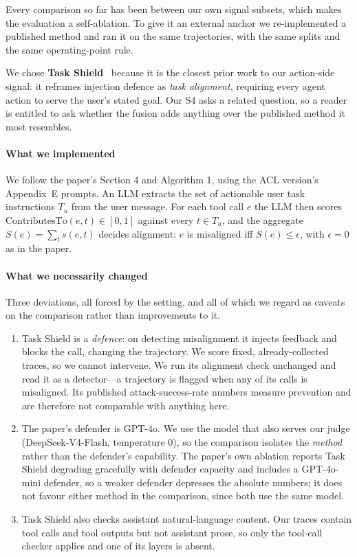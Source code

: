 \documentclass[preprint,12pt,authoryear]{elsarticle}
\theoremstyle{definition}
\begin{document}
Every comparison so far has been between our own signal subsets, which makes the
evaluation a self-ablation. To give it an external anchor we re-implemented a
published method and ran it on the same trajectories, with the same splits and the
same operating-point rule.

We chose \textbf{Task Shield}~\citep{jia2024taskshield} because it is the closest
prior work to our action-side signal: it reframes injection defence as
\emph{task alignment}, requiring every agent action to serve the user's stated
goal. Our S4 asks a related question, so a reader is entitled to ask whether the
fusion adds anything over the published method it most resembles.

\paragraph{What we implemented} We follow the paper's Section 4 and Algorithm 1,
using the ACL version's Appendix~E prompts. An LLM extracts the set of actionable user task
instructions $T_u$ from the user message. For each tool call $e$ the LLM then
scores $\mathrm{ContributesTo}(e,t) \in [0,1]$ against every $t \in T_u$, and the
aggregate $S(e) = \sum_{t} s(e,t)$ decides alignment: $e$ is misaligned iff
$S(e) \le \epsilon$, with $\epsilon = 0$ as in the paper.

\paragraph{What we necessarily changed} Three deviations, all forced by the
setting, and all of which we regard as caveats on the comparison rather than
improvements to it.
\begin{enumerate}
\item Task Shield is a \emph{defence}: on detecting misalignment it injects
feedback and blocks the call, changing the trajectory. We score fixed,
already-collected traces, so we cannot intervene. We run its alignment check
unchanged and read it as a detector---a trajectory is flagged when any of its
calls is misaligned. Its published attack-success-rate numbers measure prevention
and are therefore not comparable with anything here.
\item The paper's defender is GPT-4o. We use the model that also serves our judge
(DeepSeek-V4-Flash, temperature $0$), so the comparison isolates the \emph{method}
rather than the defender's capability. The paper's own ablation reports Task Shield
degrading gracefully with defender capacity and includes a GPT-4o-mini defender, so
a weaker defender depresses the absolute numbers; it does not favour either method
in the comparison, since both use the same model.
\item Task Shield also checks assistant natural-language content. Our traces
contain tool calls and tool outputs but not assistant prose, so only the tool-call
checker applies and one of its layers is absent.
\end{enumerate}
\end{document}

